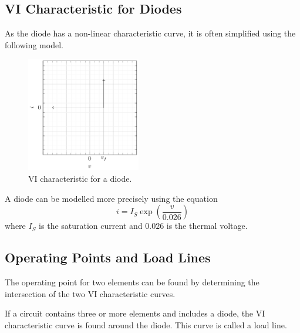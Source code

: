 \documentclass{article}
\begin{document}
\subsection{VI Characteristic for Diodes}
As the diode has a non-linear characteristic curve, it is often
simplified using the following model.
\begin{figure}[H]
    \centering
    \includegraphics[height = 5cm, keepaspectratio = true]{figures/vi_characteristic_diode.pdf}
    \caption{VI characteristic for a diode.}
\end{figure}
\begin{theorem}
    A diode can be modelled more precisely using the equation
    \begin{equation*}
        i = I_S \exp{\left( \frac{v}{0.026} \right)}
    \end{equation*}
    where \(I_S\) is the saturation current and \(0.026\) is the thermal voltage.
\end{theorem}
\subsection{Operating Points and Load Lines}
\begin{definition}
    The operating point for two elements can be found by determining the intersection
    of the two VI characteristic curves.
\end{definition}
\begin{definition}
    If a circuit contains three or more elements and includes a diode,
    the VI characteristic curve is found around the diode. This curve is
    called a load line.
\end{definition}
\end{document}
